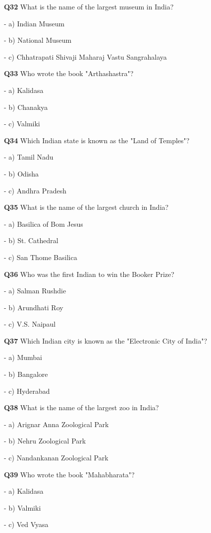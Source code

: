 \textbf{Q32} What is the name of the largest museum in India?\par
\quad - a) Indian Museum\par
\quad - b) National Museum\par
\quad - c) Chhatrapati Shivaji Maharaj Vastu Sangrahalaya\par

\textbf{Q33} Who wrote the book "Arthashastra"?\par
\quad - a) Kalidasa\par
\quad - b) Chanakya\par
\quad - c) Valmiki\par

\textbf{Q34} Which Indian state is known as the "Land of Temples"?\par
\quad - a) Tamil Nadu\par
\quad - b) Odisha\par
\quad - c) Andhra Pradesh\par

\textbf{Q35} What is the name of the largest church in India?\par
\quad - a) Basilica of Bom Jesus\par
\quad - b) St. Cathedral\par
\quad - c) San Thome Basilica\par

\textbf{Q36} Who was the first Indian to win the Booker Prize?\par
\quad - a) Salman Rushdie\par
\quad - b) Arundhati Roy\par
\quad - c) V.S. Naipaul\par

\textbf{Q37} Which Indian city is known as the "Electronic City of India"?\par
\quad - a) Mumbai\par
\quad - b) Bangalore\par
\quad - c) Hyderabad\par

\textbf{Q38} What is the name of the largest zoo in India?\par
\quad - a) Arignar Anna Zoological Park\par
\quad - b) Nehru Zoological Park\par
\quad - c) Nandankanan Zoological Park\par

\textbf{Q39} Who wrote the book "Mahabharata"?\par
\quad - a) Kalidasa\par
\quad - b) Valmiki\par
\quad - c) Ved Vyasa\par


